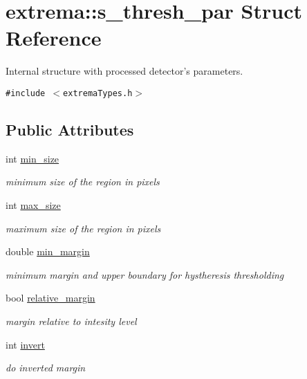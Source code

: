 \hypertarget{structextrema_1_1s__thresh__par}{
\section{extrema::s\_\-thresh\_\-par Struct Reference}
\label{structextrema_1_1s__thresh__par}
}
Internal structure with processed detector's parameters.  


{\tt \#include $<$extrema\-Types.h$>$}

\subsection*{Public Attributes}
\begin{CompactItemize}
\item 
int \hyperlink{structextrema_1_1s__thresh__par_ed4104cc58a20cce342903e9296ffef5}{min\_\-size}
\begin{CompactList}\small\item\em minimum size of the region in pixels \item\end{CompactList}\item 
int \hyperlink{structextrema_1_1s__thresh__par_e41c8394cd39342bdc0ad30b2435d2d9}{max\_\-size}
\begin{CompactList}\small\item\em maximum size of the region in pixels \item\end{CompactList}\item 
double \hyperlink{structextrema_1_1s__thresh__par_1fd2229abda53b5b3b70b61f58671347}{min\_\-margin}
\begin{CompactList}\small\item\em minimum margin and upper boundary for hystheresis thresholding \item\end{CompactList}\item 
bool \hyperlink{structextrema_1_1s__thresh__par_b341ebb6309f1e7423f5234c18d669b4}{relative\_\-margin}
\begin{CompactList}\small\item\em margin relative to intesity level \item\end{CompactList}\item 
int \hyperlink{structextrema_1_1s__thresh__par_b88feaa4021f723c03c14bad696ee559}{invert}
\begin{CompactList}\small\item\em do inverted margin \item\end{CompactList}\end{CompactItemize}


